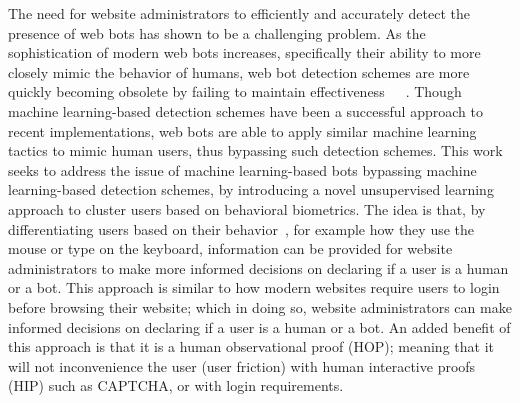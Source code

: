 The need for website administrators to efficiently and accurately detect the presence of web bots has shown to be a challenging problem.
As the sophistication of modern web bots increases, specifically their ability to more closely mimic the behavior of humans, web bot detection schemes are more quickly becoming obsolete by failing to maintain effectiveness~\cite{10.1109/DSN.2013.6575366}~\cite{ROVETTA2020102577}~\cite{STEVANOVIC2013698}.
Though machine learning-based detection schemes have been a successful approach to recent implementations, web bots are able to apply similar machine learning tactics to mimic human users, thus bypassing such detection schemes.
This work seeks to address the issue of machine learning-based bots bypassing machine learning-based detection schemes, by introducing a novel unsupervised learning approach to cluster users based on behavioral biometrics.
The idea is that, by differentiating users based on their behavior~\cite{FEHER201219}, for example how they use the mouse or type on the keyboard, information can be provided for website administrators to make more informed decisions on declaring if a user is a human or a bot.
This approach is similar to how modern websites require users to login before browsing their website; which in doing so, website administrators can make informed decisions on declaring if a user is a human or a bot.
An added benefit of this approach is that it is a human observational proof (HOP); meaning that it will not inconvenience the user (user friction) with human interactive proofs (HIP) such as CAPTCHA, or with login requirements.